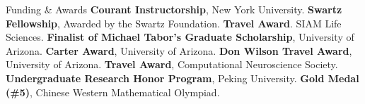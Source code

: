 \begin{rubric}{Funding \& Awards}
%
\entry*[2021 - 2024] \textbf{Courant Instructorship}, New York University.
\entry*[2020-2021] \textbf{Swartz Fellowship}, Awarded by the Swartz Foundation.
\entry*[2020] \textbf{Travel Award}. SIAM Life Sciences.
\entry*[2019] \textbf{Finalist of Michael Tabor's Graduate Scholarship}, University of Arizona.
\entry*[2019] \textbf{Carter Award}, University of Arizona.
\entry*[2018-2019] \textbf{Don Wilson Travel Award}, University of Arizona.
\entry*[2018] \textbf{Travel Award}, Computational Neuroscience Society.
\entry*[2013-2016] \textbf{Undergraduate Research Honor Program}, Peking University.
\entry*[2010] \textbf{Gold Medal (\#5)}, Chinese Western Mathematical Olympiad.
\end{rubric}